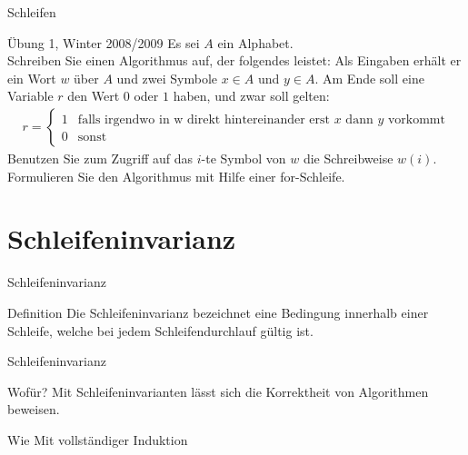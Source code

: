 	\begin{frame}{Schleifen}
    	\begin{exampleblock}{Übung 1, Winter 2008/2009}
        	Es sei $A$ ein Alphabet.\\
        	Schreiben Sie einen Algorithmus auf, der folgendes leistet: 
        	Als Eingaben erhält er ein Wort $w$ über $A$ und zwei Symbole 
        	$x \in A$ und $y \in A$. 
        	Am Ende soll eine Variable $r$ den Wert $0$ oder $1$ haben,
        	und zwar soll gelten:\\
        	\begin{align*}
            	r = \begin{cases} 1 & \text{falls irgendwo in w 
            	direkt hintereinander erst $x$ dann $y$ vorkommt}\\ 
            	0 &\text{sonst}\end{cases}
        	\end{align*}
        	Benutzen Sie zum Zugriff auf das $i$-te Symbol von $w$ 
        	die Schreibweise $w\left( i\right)$. 
        	Formulieren Sie den Algorithmus mit Hilfe einer for-Schleife.
    	\end{exampleblock}
	\end{frame}
	
	
	\section{Schleifeninvarianz}
	\begin{frame}{Schleifeninvarianz}
		\begin{block}{Definition}
			Die Schleifeninvarianz bezeichnet eine 
			Bedingung innerhalb einer Schleife, 
			welche bei jedem Schleifendurchlauf gültig ist.
		\end{block}
	\end{frame}


	\begin{frame}{Schleifeninvarianz}
		\begin{block}{Wofür?}
			Mit Schleifeninvarianten lässt sich die Korrektheit von Algorithmen beweisen.
		\end{block}
		
		\begin{block}{Wie}
			Mit vollständiger Induktion
		\end{block}
	\end{frame}
	
